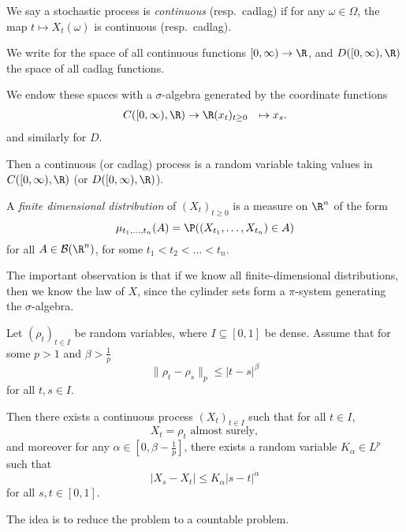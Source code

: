 \documentclass[a4paper]{article}
\begin{document}
\begin{defi}
  We say a stochastic process is \emph{continuous} (resp.\ cadlag) if for any $\omega \in \Omega$, the map $t \mapsto X_t (\omega)$ is continuous (resp.\ cadlag).
\end{defi}

\begin{notation}
  We write \term{$C([0, \infty), \R)$} for the space of all continuous functions $[0, \infty) \to \R$, and $D([0, \infty), \R)$ the space of all cadlag functions.

  We endow these spaces with a $\sigma$-algebra generated by the coordinate functions
  \begin{align*}
    C([0, \infty), \R) &\to \R
    (x_t)_{t \geq 0} &\mapsto x_s.
  \end{align*}
  and similarly for $D$.
\end{notation}

Then a continuous (or cadlag) process is a random variable taking values in $C([0, \infty), \R)$ (or $D([0, \infty), \R)$).

\begin{defi}
  A \emph{finite dimensional distribution} of $(X_t)_{t \geq 0}$ is a measure on $\R^n$ of the form
  \[
    \mu_{t_1, \ldots, t_n}(A) = \P((X_{t_1}, \ldots, X_{t_n}) \in A)
  \]
  for all $A \in \mathcal{B}(\R^n)$, for some $t_1 < t_2 < \ldots < t_n$.
\end{defi}

The important observation is that if we know all finite-dimensional distributions, then we know the law of $X$, since the cylinder sets form a $\pi$-system generating the $\sigma$-algebra.

\begin{thm}
  Let $(\rho_t)_{t \in I}$ be random variables, where $I \subseteq [0, 1]$ be dense. Assume that for some $p > 1$ and $\beta > \frac{1}{p}$
  \[
    \|\rho_t - \rho_s\|_p \leq |t - s|^\beta\tag{$*$}
  \]
  for all $t, s \in I$.

  Then there exists a continuous process $(X_t)_{t \in I}$ such that for all $t \in I$, 
  \[
    X_t = \rho_t \text{ almost surely},
  \]
  and moreover for any $\alpha \in [0, \beta - \frac{1}{p}]$, there exists a random variable $K_\alpha \in L^p$ such that
  \[
    |X_s - X_t| \leq K_\alpha |s - t|^\alpha
  \]
  for all $s, t \in [0, 1]$.
\end{thm}
The idea is to reduce the problem to a countable problem.
\end{document}
